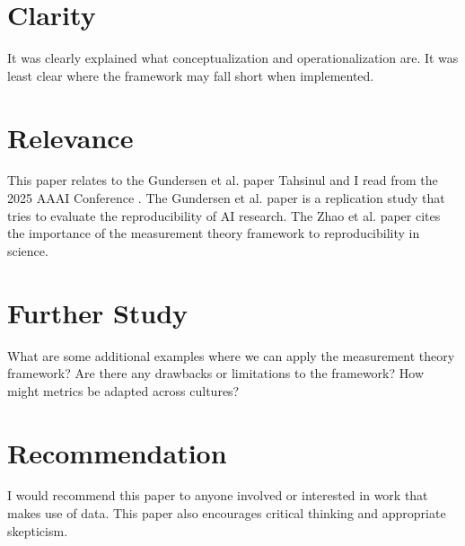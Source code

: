 \documentclass[12pt, letterpaper]{article}
\begin{document}

\section{Clarity}
\label{sec:clarity}
It was clearly explained what conceptualization and operationalization are. It was least clear where the framework may fall short when implemented.

\section{Relevance}
\label{sec:relevance}
This paper relates to the Gundersen et al. paper Tahsinul and I read from the 2025 AAAI Conference \cite{gundersen2024unreasonableeffectivenessopenscience}. The Gundersen et al. paper is a replication study that tries to evaluate the reproducibility of AI research. The Zhao et al. paper cites the importance of the measurement theory framework to reproducibility in science.

\section{Further Study}
\label{sec:further}
What are some additional examples where we can apply the measurement theory framework? Are there any drawbacks or limitations to the framework? How might metrics be adapted across cultures?

\section{Recommendation}
\label{sec:rec}
I would recommend this paper to anyone involved or interested in work that makes use of data. This paper also encourages critical thinking and appropriate skepticism.

\end{document}
